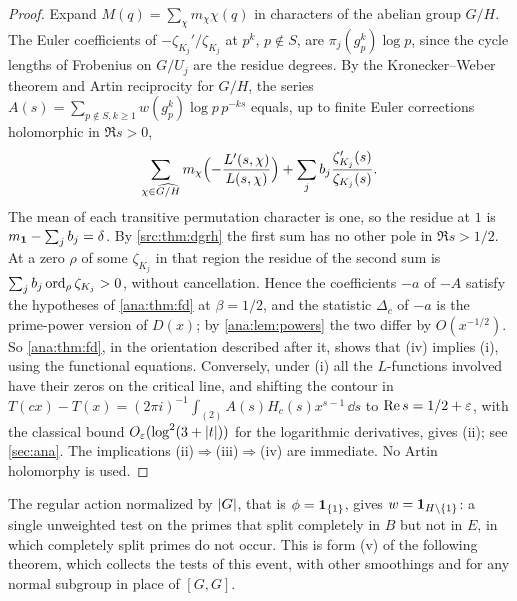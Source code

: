 \begin{proof}
Expand $M(q)=\sum_\chi m_\chi\chi(q)$ in characters of the abelian group $G/H$. The Euler
coefficients of $-\zeta_{K_j}'/\zeta_{K_j}$ at $p^k$, $p\notin S$, are
$\pi_j(g_p^k)\log p$, since the cycle lengths of Frobenius on $G/U_j$ are the residue
degrees. By the Kronecker--Weber theorem and Artin reciprocity for $G/H$, the series
$A(s)=\sum_{p\notin S,k\ge1}w(g_p^k)\log p\,p^{-ks}$ equals, up to finite Euler corrections
holomorphic in $\Re s>0$,
\[
 \sum_{\chi\in\widehat{G/H}}m_\chi\Bigl(-\frac{L'(s,\chi)}{L(s,\chi)}\Bigr)
 +\sum_jb_j\frac{\zeta_{K_j}'(s)}{\zeta_{K_j}(s)} .
\]
The mean of each transitive permutation character is one, so the residue at $1$ is
$m_{\mathbf{1}}-\sum_jb_j=\delta$. By \cref{src:thm:dgrh} the first sum has no other pole in
$\Re s>1/2$. At a zero $\rho$ of some $\zeta_{K_j}$ in that region the residue of the
second sum is $\sum_jb_j\operatorname{ord}_\rho\zeta_{K_j}>0$, without cancellation. Hence the
coefficients $-a$ of $-A$ satisfy the hypotheses of \cref{ana:thm:fd} at $\beta=1/2$, and the
statistic $\Delta_c$ of $-a$ is the prime-power version of $D(x)$; by \cref{ana:lem:powers}
the two differ by $O(x^{-1/2})$. So \cref{ana:thm:fd}, in the orientation described after it,
shows that (iv) implies (i), using the functional equations. Conversely, under (i) all the $L$-functions involved have their zeros on the
critical line, and shifting the contour in
$T(cx)-T(x)=(2\pi i)^{-1}\int_{(2)}A(s)H_c(s)x^{s-1}\,\dd s$ to $\operatorname{Re} s=1/2+\varepsilon$, with the
classical bound $O_\varepsilon(\log^2(3+\lvert t\rvert))$ for the logarithmic derivatives, gives (ii); see
\cref{sec:ana}. The implications (ii)$\Rightarrow$(iii)$\Rightarrow$(iv) are immediate. No
Artin holomorphy is used.
\end{proof}

The regular action normalized by $\lvert G\rvert$, that is $\phi=\mathbf{1}_{\{1\}}$, gives
$w=\mathbf{1}_{H\setminus\{1\}}$: a single unweighted test on the primes that split completely
in $B$ but not in $E$, in which completely split primes do not occur. This is form (v) of
the following theorem, which collects the tests of this event, with other smoothings and
for any normal subgroup in place of $[G,G]$.

